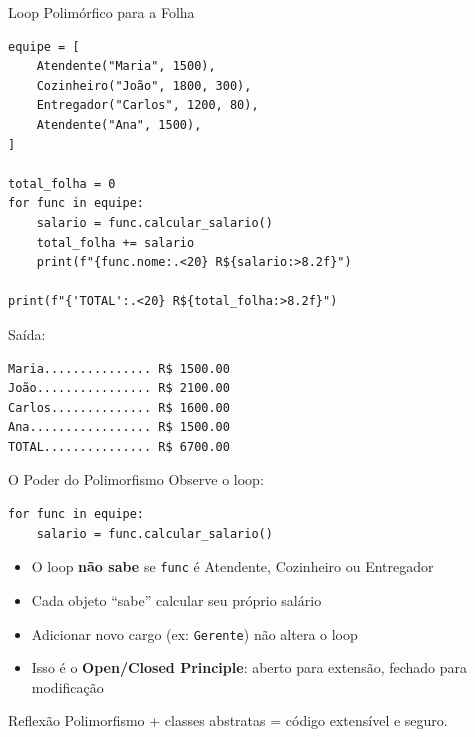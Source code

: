 \documentclass[aspectratio=169]{beamer}
\begin{document}
\begin{frame}{Loop Polimórfico para a Folha}
  \begin{lstlisting}
equipe = [
    Atendente("Maria", 1500),
    Cozinheiro("João", 1800, 300),
    Entregador("Carlos", 1200, 80),
    Atendente("Ana", 1500),
]

total_folha = 0
for func in equipe:
    salario = func.calcular_salario()
    total_folha += salario
    print(f"{func.nome:.<20} R${salario:>8.2f}")

print(f"{'TOTAL':.<20} R${total_folha:>8.2f}")
  \end{lstlisting}

  Saída:
  \begin{lstlisting}[numbers=none]
Maria............... R$ 1500.00
João................ R$ 2100.00
Carlos.............. R$ 1600.00
Ana................. R$ 1500.00
TOTAL............... R$ 6700.00
  \end{lstlisting}
\end{frame}

\begin{frame}[fragile]{O Poder do Polimorfismo}
  Observe o loop:

  \begin{lstlisting}
for func in equipe:
    salario = func.calcular_salario()
  \end{lstlisting}

  \bigskip

  \begin{itemize}
    \item O loop \textbf{não sabe} se \texttt{func} é Atendente, Cozinheiro ou Entregador
    \item Cada objeto ``sabe'' calcular seu próprio salário
    \item Adicionar novo cargo (ex: \texttt{Gerente}) não altera o loop
    \item Isso é o \textbf{Open/Closed Principle}: aberto para extensão, fechado para modificação
  \end{itemize}

  \begin{exampleblock}{Reflexão}
    Polimorfismo + classes abstratas = código extensível e seguro.
  \end{exampleblock}
\end{frame}

\end{document}
